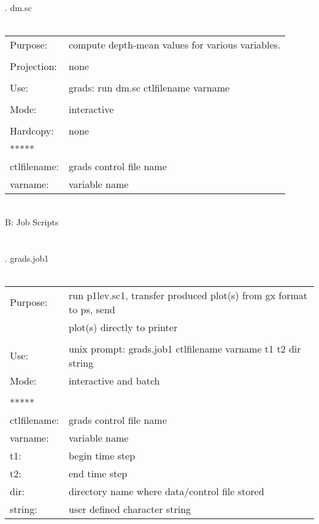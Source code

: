 . dm.sc \\ \\
\begin{tabular}{ll}
Purpose:     &  compute depth-mean values for various variables.   \\
\\
Projection:  &  none                                               \\
\\
Use:         &  grads: run dm.sc ctlfilename varname               \\
\\
Mode:        &  interactive                                        \\
\\
Hardcopy:    &  none                                               \\
*****  \\
ctlfilename: &  grads control file name  \\                                    
varname:     &  variable name    \\               
\end{tabular}
\\
\newpage
B: Job Scripts
\\
\\
\\
. grads.job1 \\ \\
\begin{tabular}{ll}
Purpose:     &  run p1lev.sc1, transfer produced plot(s) from gx format to ps, send \\
             &  plot(s) directly to printer  \\
\\
Use:         &  unix prompt: grads.job1 ctlfilename varname t1 t2 dir  string    \\
Mode:        &  interactive and batch        \\ 
\\
*****  \\
ctlfilename: &  grads control file name     \\
varname:     &  variable name     \\
t1:       &  begin time step    \\
t2:       &  end time step   \\ 
dir:      &  directory name where data/control file stored \\ 
string:   &  user defined character string  
\end{tabular}
